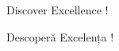 \documentclass[a4paper,11pt]{article}
\title{}
\author{}
\begin{document}
\textcolor{UVTYellow}{{\Huge Discover Excellence}{\fontsize{50}{60} \selectfont !}}

\bigskip

\textcolor{UVTYellow}{{\Huge Descoperă Excelența}{\fontsize{50}{60} \selectfont !}}
\end{document}
